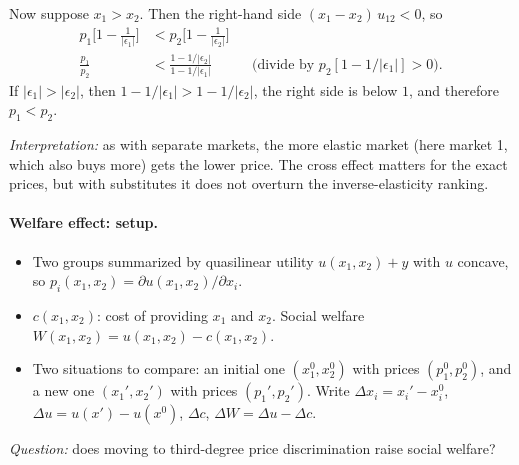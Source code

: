 Now suppose $x_1>x_2$. Then the right-hand side $(x_1-x_2)\,u_{12}<0$, so
\begin{align*}
p_1\Big[1-\tfrac{1}{|\epsilon_1|}\Big]&<p_2\Big[1-\tfrac{1}{|\epsilon_2|}\Big]\\
\frac{p_1}{p_2}&<\frac{1-1/|\epsilon_2|}{1-1/|\epsilon_1|} &&\text{(divide by $p_2[1-1/|\epsilon_1|]>0$).}
\end{align*}
If $|\epsilon_1|>|\epsilon_2|$, then $1-1/|\epsilon_1|>1-1/|\epsilon_2|$, the right side is below $1$, and therefore $p_1<p_2$.

\emph{Interpretation:} as with separate markets, the more elastic market (here market 1, which also buys more) gets the lower price. The cross effect matters for the exact prices, but with substitutes it does not overturn the inverse-elasticity ranking.

\paragraph{Welfare effect: setup.}
\begin{itemize}
\item Two groups summarized by quasilinear utility $u(x_1,x_2)+y$ with $u$ concave, so $p_i(x_1,x_2)=\partial u(x_1,x_2)/\partial x_i$.
\item $c(x_1,x_2)$: cost of providing $x_1$ and $x_2$. Social welfare $W(x_1,x_2)=u(x_1,x_2)-c(x_1,x_2)$.
\item Two situations to compare: an initial one $(x_1^0,x_2^0)$ with prices $(p_1^0,p_2^0)$, and a new one $(x_1',x_2')$ with prices $(p_1',p_2')$. Write $\Delta x_i=x_i'-x_i^0$, $\Delta u=u(x')-u(x^0)$, $\Delta c$, $\Delta W=\Delta u-\Delta c$.
\end{itemize}
\emph{Question:} does moving to third-degree price discrimination raise social welfare?

